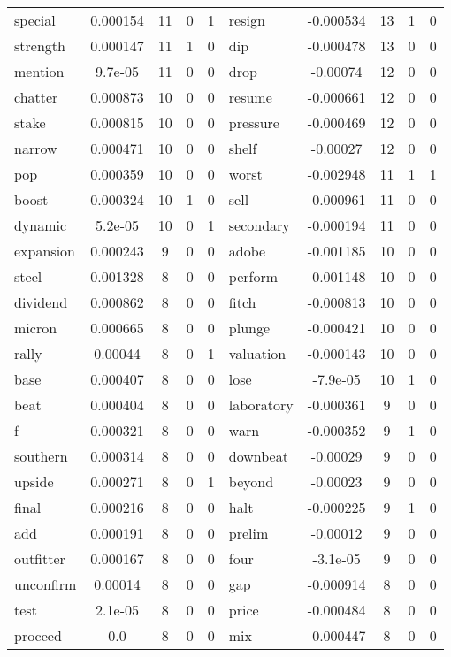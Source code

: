 \documentclass[ oneside,%
                    author={Joshua Felmeden},
                    degree={MEng},
                     title={Sentiment Analysis of Financial Headlines Based on Stock Returns},
                  subtitle={Research}]{dissertation}
\begin{document}
\begin{table}[!ht]
\begin{tabular}{lcccclcccc}
special & 0.000154 & 11 & 0 & 1 & resign & -0.000534 & 13 & 1 & 0 \\
strength & 0.000147 & 11 & 1 & 0 & dip & -0.000478 & 13 & 0 & 0 \\
mention & 9.7e-05 & 11 & 0 & 0 & drop & -0.00074 & 12 & 0 & 0 \\
chatter & 0.000873 & 10 & 0 & 0 & resume & -0.000661 & 12 & 0 & 0 \\
stake & 0.000815 & 10 & 0 & 0 & pressure & -0.000469 & 12 & 0 & 0 \\
narrow & 0.000471 & 10 & 0 & 0 & shelf & -0.00027 & 12 & 0 & 0 \\
pop & 0.000359 & 10 & 0 & 0 & worst & -0.002948 & 11 & 1 & 1 \\
boost & 0.000324 & 10 & 1 & 0 & sell & -0.000961 & 11 & 0 & 0 \\
dynamic & 5.2e-05 & 10 & 0 & 1 & secondary & -0.000194 & 11 & 0 & 0 \\
expansion & 0.000243 & 9 & 0 & 0 & adobe & -0.001185 & 10 & 0 & 0 \\
steel & 0.001328 & 8 & 0 & 0 & perform & -0.001148 & 10 & 0 & 0 \\
dividend & 0.000862 & 8 & 0 & 0 & fitch & -0.000813 & 10 & 0 & 0 \\
micron & 0.000665 & 8 & 0 & 0 & plunge & -0.000421 & 10 & 0 & 0 \\
rally & 0.00044 & 8 & 0 & 1 & valuation & -0.000143 & 10 & 0 & 0 \\
base & 0.000407 & 8 & 0 & 0 & lose & -7.9e-05 & 10 & 1 & 0 \\
beat & 0.000404 & 8 & 0 & 0 & laboratory & -0.000361 & 9 & 0 & 0 \\
f & 0.000321 & 8 & 0 & 0 & warn & -0.000352 & 9 & 1 & 0 \\
southern & 0.000314 & 8 & 0 & 0 & downbeat & -0.00029 & 9 & 0 & 0 \\
upside & 0.000271 & 8 & 0 & 1 & beyond & -0.00023 & 9 & 0 & 0 \\
final & 0.000216 & 8 & 0 & 0 & halt & -0.000225 & 9 & 1 & 0 \\
add & 0.000191 & 8 & 0 & 0 & prelim & -0.00012 & 9 & 0 & 0 \\
outfitter & 0.000167 & 8 & 0 & 0 & four & -3.1e-05 & 9 & 0 & 0 \\
unconfirm & 0.00014 & 8 & 0 & 0 & gap & -0.000914 & 8 & 0 & 0 \\
test & 2.1e-05 & 8 & 0 & 0 & price & -0.000484 & 8 & 0 & 0 \\
proceed & 0.0 & 8 & 0 & 0 & mix & -0.000447 & 8 & 0 & 0 \\

\end{tabular}
\end{table}
\end{document}
